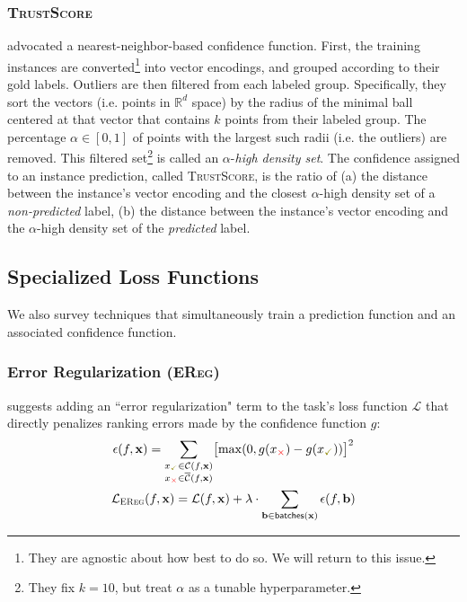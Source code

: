 \documentclass[11pt]{article}
\begin{document}
\subsubsection*{\textsc{TrustScore}}

\cite{jiang2018trust} advocated a nearest-neighbor-based confidence function. First, the training instances are converted\footnote{They are agnostic about how best to do so. We will return to this issue.} into vector encodings, and grouped according to their gold labels. Outliers are then filtered from each labeled group. Specifically, they sort the vectors (i.e. points in $\mathbb{R}^d$ space) by the radius of the minimal ball centered at that vector that contains $k$ points from their labeled group. The percentage $\alpha \in [0, 1]$ of points with the largest such radii (i.e. the outliers) are removed. This filtered set\footnote{They fix $k=10$, but treat $\alpha$ as a tunable hyperparameter.} is called an $\alpha$-\emph{high density set}. The confidence assigned to an instance prediction, called \textsc{TrustScore}, is the ratio of (a) the distance between the instance's vector encoding and the closest $\alpha$-high density set of a \emph{non-predicted} label, (b) the distance between the instance's vector encoding and the $\alpha$-high density set of the \emph{predicted} label.

\subsection{Specialized Loss Functions}

We also survey techniques that simultaneously train a prediction function and an associated confidence function. 

\subsubsection*{Error Regularization (\textsc{EReg})}

\cite{xin-etal-2021-art} suggests adding an ``error regularization" term to the task's loss function $\mathcal{L}$ that directly penalizes ranking errors made by the confidence function $g$:
\begin{gather*}
\epsilon(f, \mathbf{x}) = \sum_{\substack{
x_{\textcolor{olive}{\checkmark}} \in \mathcal{C}(f, \mathbf{x})\\
x_{\textcolor{red}{\times}} \in \overline{\mathcal{C}}(f, \mathbf{x})}} \bigl[ \max(0, g(x_{\textcolor{red}{\times}}) - g(x_{\textcolor{olive}{\checkmark}})) \bigr] ^2 \\
\mathcal{L}_{\textsc{EReg}}(f, \mathbf{x}) = \mathcal{L}(f, \mathbf{x}) + \lambda \cdot \sum_{\mathbf{b} \in \mathsf{batches}(\mathbf{x})} \epsilon(f, \mathbf{b})
\end{gather*}
\end{document}
